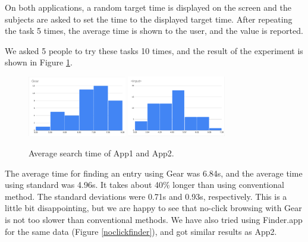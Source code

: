 \documentclass[conference]{IEEEtran}
\begin{document}
On both applications, a random target time is displayed on the screen and the subjects are
asked to set the time to the displayed target time.
After repeating the task 5 times, the average time is shown to the user, and the value
is reported.

We asked 5 people to try these tasks 10 times, and the result of the experiment is
shown in Figure \ref{monorailtime}.

\begin{figure}[H]
\centerline{
  \includegraphics[width=43mm,bb=0 0 960 593]{figures/6c39f199b341e30ffc28850afbd90a5a.png}
  \includegraphics[width=43mm,bb=0 0 960 593]{figures/de3f0545e0d0d8dfb9708d2420fb5407.png}
}
\caption{Average search time of App1 and App2.}
\label{monorailtime}
\end{figure}

The average time for finding an entry using Gear was 6.84s,
and the average time using standard  was 4.96s.
It takes about 40\% longer than using conventional method.
The standard deviations were 0.71s and 0.93s, respectively.
%
This is a little bit disappointing,
but we are happy to see that
no-click browsing with Gear is not too slower than
conventional methods.
%
We have also tried using Finder.app for the same data (Figure \ref{noclickfinder}), and
got similar results as App2.

\end{document}
